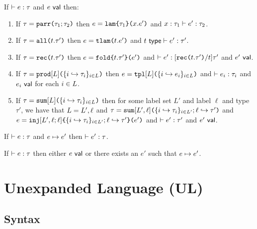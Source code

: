 \begin{condition}\label{condition:canonical-forms-UP} If $\vdash e : \tau$ and $e~\mathsf{val}$ then:
\begin{enumerate}
\item If $\tau=\texttt{parr}\texttt{(}\tau_1; \tau_2\texttt{)}$ then $e=\texttt{lam}\texttt{\{}\tau_1\texttt{\}(}x.e'\texttt{)}$ and $x : \tau_1 \vdash e' : \tau_2$.
\item If $\tau=\texttt{all}\texttt{(}t.\tau'\texttt{)}$ then $e=\texttt{tlam}\texttt{(}t.e'\texttt{)}$ and $t~\mathsf{type} \vdash e' : \tau'$.
\item If $\tau=\texttt{rec}\texttt{(}t.\tau'\texttt{)}$ then $e=\texttt{fold}\texttt{\{}t.\tau'\texttt{\}(}e'\texttt{)}$ and $\vdash e' : [\texttt{rec}\texttt{(}t.\tau'\texttt{)}/t]\tau'$ and $e'~\mathsf{val}$. 
\item If $\tau=\texttt{prod}[L]\texttt{(}\{i \hookrightarrow \tau_{i}\}_{i \in L}\texttt{)}$ then $e=\texttt{tpl}[L]\texttt{(}\{i \hookrightarrow e_{i}\}_{i \in L}\texttt{)}$ and $\vdash e_i : \tau_i$ and $e_i~\mathsf{val}$ for each $i \in L$.
\item If $\tau=\texttt{sum}[L]\texttt{(}\{i \hookrightarrow \tau_{i}\}_{i \in L}\texttt{)}$ then for some label set $L'$ and label $\ell$ and type $\tau'$, we have that $L=L', \ell$ and $\tau=\texttt{sum}[L', \ell]\texttt{(}\{i \hookrightarrow \tau_{i}\}_{i \in L'}; \ell \hookrightarrow \tau'\texttt{)}$ and $e=\texttt{inj}[L', \ell; \ell]\texttt{\{}\{i \hookrightarrow \tau_{i}\}_{i \in L'}; \ell \hookrightarrow \tau'\texttt{\}(}e'\texttt{)}$ and $\vdash e' : \tau'$ and $e'~\mathsf{val}$.
\end{enumerate}\end{condition}


\begin{condition}[Preservation]\label{condition:preservation-UP} If $\vdash e : \tau$ and $e \mapsto e'$ then $\vdash e' : \tau$. \end{condition}

\begin{condition}[Progress]\label{condition:progress-UP} If $\vdash e : \tau$ then either $e~\mathsf{val}$  or there exists an $e'$ such that $e \mapsto e'$. \end{condition}

\section{Unexpanded Language (UL)}\label{appendix:SES-uexps}
\subsection{Syntax}\label{appendix:SES-syntax}\label{appendix:SES-shared-forms}
